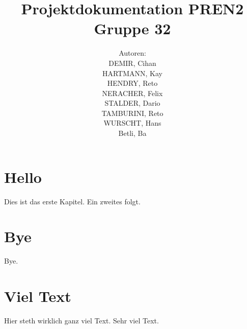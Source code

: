 \documentclass[11pt,german]{article}
\author{	Autoren:\\
			DEMIR, Cihan\\
			HARTMANN, Kay\\
			HENDRY, Reto\\
			NERACHER, Felix\\			
			STALDER, Dario\\
			TAMBURINI, Reto\\
			WURSCHT, Hans\\
			Betli, Ba
		}
\title{Projektdokumentation PREN2\\Gruppe 32}
\begin{document}
  \maketitle
  \tableofcontents
	\newpage	
  \section{Hello}
  Dies ist das erste Kapitel.
  Ein zweites folgt.
  \section{Bye}
  Bye.
  \section{Viel Text}
  Hier steth wirklich ganz viel Text.
  Sehr viel Text.
\end{document}
